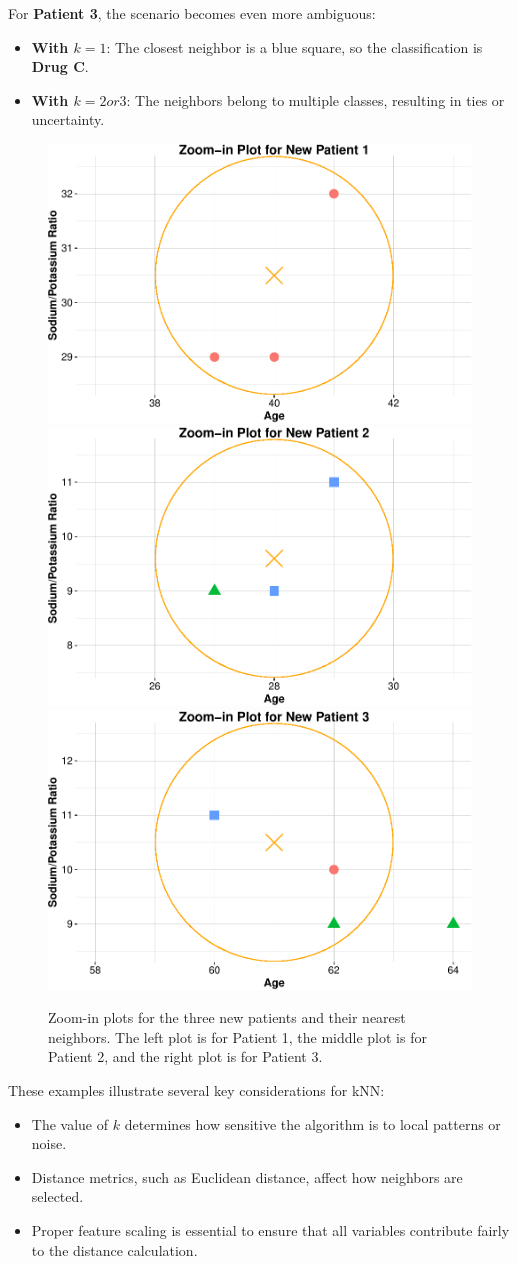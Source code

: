 \documentclass[
]{book}
\providecommand{\tightlist}{%
  \setlength{\itemsep}{0pt}\setlength{\parskip}{0pt}}
\theoremstyle{definition}
\theoremstyle{definition}
\theoremstyle{definition}
\theoremstyle{definition}
\theoremstyle{remark}
\begin{document}
For \textbf{Patient 3}, the scenario becomes even more ambiguous:

\begin{itemize}
\tightlist
\item
  \textbf{With \(k = 1\)}: The closest neighbor is a blue square, so the classification is \textbf{Drug C}.\\
\item
  \textbf{With \(k = 2 or 3\)}: The neighbors belong to multiple classes, resulting in ties or uncertainty.
\end{itemize}

\begin{figure}
\includegraphics[width=0.33\linewidth]{knn_files/figure-latex/scatter-plot-ex-drug-3-1} \includegraphics[width=0.33\linewidth]{knn_files/figure-latex/scatter-plot-ex-drug-3-2} \includegraphics[width=0.33\linewidth]{knn_files/figure-latex/scatter-plot-ex-drug-3-3} \caption{Zoom-in plots for the three new patients and their nearest neighbors. The left plot is for Patient 1, the middle plot is for Patient 2, and the right plot is for Patient 3.}\label{fig:scatter-plot-ex-drug-3}
\end{figure}

These examples illustrate several key considerations for kNN:

\begin{itemize}
\tightlist
\item
  The value of \(k\) determines how sensitive the algorithm is to local patterns or noise.\\
\item
  Distance metrics, such as Euclidean distance, affect how neighbors are selected.\\
\item
  Proper feature scaling is essential to ensure that all variables contribute fairly to the distance calculation.
\end{itemize}
\end{document}
